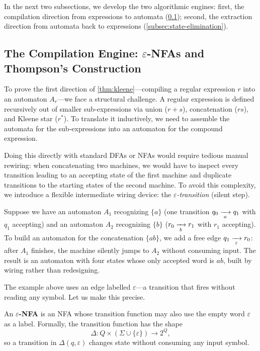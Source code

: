 In the next two subsections, we develop the two algorithmic engines: first, the compilation direction from expressions to automata (\cref{subsec:epsilon-nfa}); second, the extraction direction from automata back to expressions (\cref{subsec:state-elimination}).

\subsection{The Compilation Engine: \texorpdfstring{$\varepsilon$}{ε}-NFAs and Thompson's Construction}
\label{subsec:epsilon-nfa}

To prove the first direction of \cref{thm:kleene}---compiling a regular expression $r$ into an automaton $A_r$---we face a structural challenge. A regular expression is defined recursively out of smaller sub-expressions via union ($r+s$), concatenation ($rs$), and Kleene star ($r^*$). To translate it inductively, we need to assemble the automata for the sub-expressions into an automaton for the compound expression.

Doing this directly with standard DFAs or NFAs would require tedious manual rewiring: when concatenating two machines, we would have to inspect every transition leading to an accepting state of the first machine and duplicate transitions to the starting states of the second machine. To avoid this complexity, we introduce a flexible intermediate wiring device: the \emph{$\varepsilon$-transition} (silent step).

\begin{example}
\label{ex:epsilon-nfa-preview}
Suppose we have an automaton $A_1$ recognizing $\{a\}$ (one transition
$q_0\xrightarrow[{\;a\;}]{}q_1$ with $q_1$ accepting) and an automaton $A_2$
recognizing $\{b\}$ ($r_0\xrightarrow[{\;b\;}]{}r_1$ with $r_1$ accepting).
To build an automaton for the concatenation $\{ab\}$, we add a free
edge $q_1\xrightarrow[{\;\varepsilon\;}]{}r_0$: after $A_1$ finishes, the
machine silently jumps to $A_2$ without consuming input.  The result is
an automaton with four states whose only accepted word is $ab$, built by
wiring rather than redesigning.
\end{example}

The example above uses an edge labelled $\varepsilon$---a transition
that fires without reading any symbol.  Let us make this precise.

\begin{definition}
\label{def:epsilon-nfa}
An \textbf{$\varepsilon$-NFA} is an NFA whose transition function may
also use the empty word $\varepsilon$ as a label.  Formally, the
transition function has the shape
\[
  \Delta : Q\times(\Sigma\cup\{\varepsilon\})\to 2^Q,
\]
so a transition in $\Delta(q,\varepsilon)$ changes state without
consuming any input symbol.
\end{definition}

